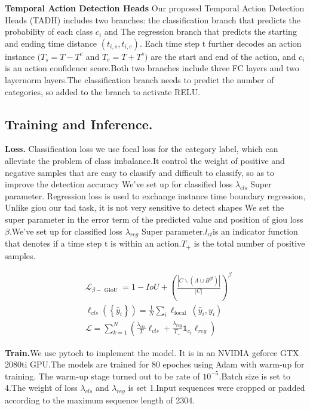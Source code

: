 \documentclass[10pt,twocolumn,letterpaper]{article}
\begin{document}
\textbf{Temporal Action Detection Heads} 
Our proposed Temporal Action Detection Heads (TADH) includes two branches: the classification branch that predicts the probability of each class $c_i$ and The regression branch that predicts the starting and ending time distance $(t_{i,s}, t_{i,e})$. Each time step t further decodes an action instance
$(T_s = T-T^e$ and $T_e = T+T^s)$ are the start and end of the action, and $c_i$ is an action confidence score.Both two branches include three FC layers and two layernorm layers.The classification branch needs to predict the number of categories, so added to the branch to activate RELU.

\subsection{Training and Inference.}
\textbf{Loss.}
Classification loss we use focal loss\cite{lin2017focal} for the category label, which can alleviate the problem of class imbalance.It control the weight of positive and negative samples that are easy to classify and difficult to classify, so as to improve the detection accuracy
We've set up for classified loss $\lambda_{cls}$ Super parameter.
Regression loss is used to exchange instance time boundary regression, Unlike giou\cite{rezatofighi2019generalized} our tad task, it is not very sensitive to detect shapes We set the super parameter in the error term of the predicted value and position of giou loss $\beta$.We've set up for classified loss $\lambda_{reg}$ Super parameter.$l_{ct}$is an indicator function that denotes if a time step t is within an action.$T_{+}$ is the total number of positive samples.

\begin{equation}
\begin{aligned}
    &\mathcal{L}_{\beta-\text { GloU }}=1-IoU+\left(\frac{\left|C \backslash\left(A \cup B^{g t}\right)\right|}{|C|}\right)^{\beta}\\
    &\ell_{cls}\left(\left\{\hat{y}_{i}\right\}\right)=\frac{1}{N} \sum_{i} \ell_{\text {focal }}\left(\hat{y}_{i}, y_{i}\right)\\
&\mathcal{L} = \sum_{k=1}^N (\frac{\lambda_{cls}}{T}\ell_{cls}+ \frac{\lambda_{reg}}{T_+}\mathbb{1}_{c_{t}}\ell_{reg})
\end{aligned}
\end{equation}

\textbf{Train.}We use pytoch to implement the model. It is in an NVIDIA geforce GTX 2080ti GPU.The models are trained for 80 epoches using Adam with warm-up for training. The warm-up stage turned out to be rate of $10^{-5}$.Batch size is set to 4.The weight of loss $\lambda_{cls}$ and $\lambda_{reg}$ is set 1.Input sequences were cropped or padded according to the maximum sequence length of 2304.
\end{document}

